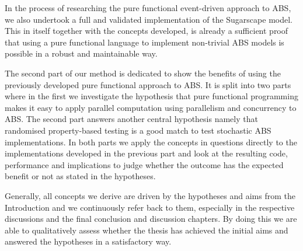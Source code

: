 In the process of researching the pure functional event-driven approach to ABS, we also undertook a full and validated implementation of the Sugarscape model. This in itself together with the concepts developed, is already a sufficient proof that using a pure functional language to implement non-trivial ABS models is possible in a robust and maintainable way.


The second part of our method is dedicated to show the benefits of using the previously developed pure functional approach to ABS. It is split into two parts where in the first we investigate the hypothesis that pure functional programming makes it easy to apply parallel computation using parallelism and concurrency to ABS. The second part answers another central hypothesis namely that randomised property-based testing is a good match to test stochastic ABS implementations. In both parts we apply the concepts in questions directly to the implementations developed in the previous part and look at the resulting code, performance and implications to judge whether the outcome has the expected benefit or not as stated in the hypotheses.

Generally, all concepts we derive are driven by the hypotheses and aims from the Introduction and we continuously refer back to them, especially in the respective discussions and the final conclusion and discussion chapters. By doing this we are able to qualitatively assess whether the thesis has achieved the initial aims and answered the hypotheses in a satisfactory way.
